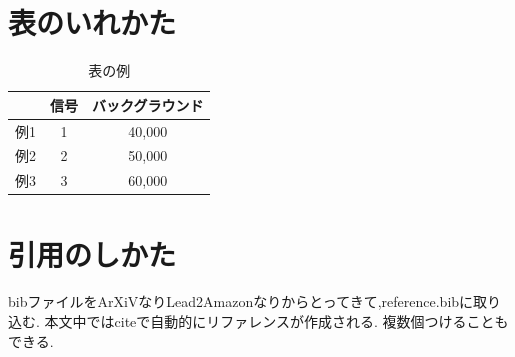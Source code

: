 \section{表のいれかた}\label{sec:table}

\begin{table}[tbp]
	\centering
	\caption{表の例}
		\label{tab:test5}	
	  \begin{tabular}{lcc} 
		\hline
		 		&信号& バックグラウンド \\ 
		\hline \hline
		例1 	& 1	 & 40,000			\\
		例2 	& 2  & 50,000			\\
		例3 	& 3  & 60,000			\\
		\hline
	  \end{tabular}
\end{table}

\section{引用のしかた}\label{sec:ref}
bibファイルをArXiVなりLead2Amazonなりからとってきて,reference.bibに取り込む.
本文中ではciteで自動的にリファレンスが作成される.\cite{myThesisTest1}
複数個つけることもできる.\cite{myThesisTest2,myWebsite}


